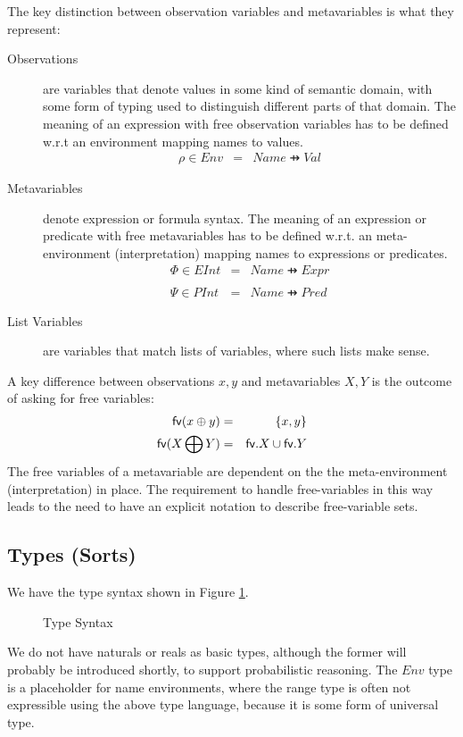 The key distinction between observation variables
and metavariables is what they represent:
\begin{description}
  \item[Observations]
     are variables that denote values in some
    kind of semantic domain, with some form of typing used
    to distinguish different parts of that domain.
    The meaning of an expression with free observation variables
    has to be defined w.r.t an environment mapping names to values.
    \begin{eqnarray*}
     \rho \in Env &=& Name \pfun Val
    \end{eqnarray*}
  \item[Metavariables]
     denote expression or formula syntax.
     The meaning of an expression or predicate with free metavariables
     has to be defined w.r.t. an meta-environment (interpretation) mapping names
     to expressions or predicates.
     \begin{eqnarray*}
        \Phi \in EInt &=& Name \pfun Expr \\
     \\ \Psi \in PInt &=& Name \pfun Pred
     \end{eqnarray*}
  \item[List Variables]
    are variables that match lists of variables, where such lists
    make sense.
\end{description}
A key difference between observations $x,y$ and metavariables $X,Y$
is the  outcome of asking for free variables:
\begin{eqnarray*}
  \mathsf{fv} (x \oplus y)&=& \{x,y\}
\\ \mathsf{fv} (X \bigoplus Y) &=& \mathsf{fv}.X \cup \mathsf{fv}.Y
\end{eqnarray*}
The free variables of a metavariable are dependent on the
the meta-environment (interpretation) in place.
The requirement to handle free-variables in this way leads
to the need to have an explicit notation to describe free-variable sets.

\newpage
\subsection{Types (Sorts)}

We have the type syntax shown in Figure \ref{fig:UTP2:types}.
\begin{figure}
\boxedm{\TYPEMATHSYNTAX}
  \caption{ Type Syntax}
  \label{fig:UTP2:types}
\end{figure}
We do not have naturals or reals as basic types,
although the former will probably be introduced shortly,
to support probabilistic reasoning.
The $Env$ type is a placeholder for name environments,
where the range type is often not expressible using the
above type language, because it is some form of universal type.


